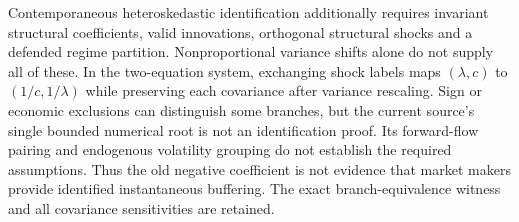 \documentclass[12pt]{article}
\theoremstyle{definition}
\theoremstyle{remark}
\begin{document}
Contemporaneous heteroskedastic identification additionally requires invariant structural coefficients, valid innovations, orthogonal structural shocks and a defended regime partition. Nonproportional variance shifts alone do not supply all of these. In the two-equation system, exchanging shock labels maps $(\lambda,c)$ to $(1/c,1/\lambda)$ while preserving each covariance after variance rescaling. Sign or economic exclusions can distinguish some branches, but the current source's single bounded numerical root is not an identification proof. Its forward-flow pairing and endogenous volatility grouping do not establish the required assumptions. Thus the old negative coefficient is not evidence that market makers provide identified instantaneous buffering. The exact branch-equivalence witness and all covariance sensitivities are retained.
\end{document}
